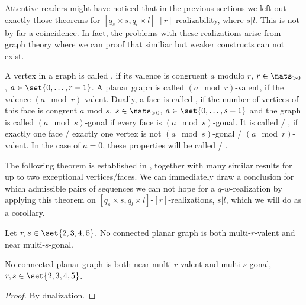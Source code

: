 \label{sec:negative:results}

Attentive readers might have noticed that in the previous sections we left out exactly those theorems for $[q_s \times s, q_l \times l]$-$[r]$-realizability, where $s | l$. This is not by far a coincidence. In fact, the problems with these realizations arise from graph theory where we can proof that similiar but weaker constructs can not exist.
\clearpage
\begin{definition} A vertex in a graph is called , if its valence is congruent $a$ modulo $r$, $r \in \nats_{>0}$, $a \in \set{0, \dots, r - 1}$. A planar graph is called $(a \mod r)$-valent, if the valence $(a \mod r)$-valent. Dually, a face is called , if the number of vertices of this face is congrent $a$ mod $s$, $s \in \nats_{>0}$, $a \in \set{0, \dots, s - 1}$ and the graph is called $(a \mod s)$-gonal if every face is $(a \mod s)$-gonal. It is called  / , if exactly one face / exactly one vertex is not $(a \mod s)$-gonal / $(a \mod r)$-valent. In the case of $a = 0$, these properties will be called  / .
\end{definition}

The following theorem is established in \cite{malkevitch1970properties}, together with many similar results for up to two exceptional vertices/faces. We can immediately draw a conclusion for which admissible pairs of sequences we can not hope for a $q$-$w$-realization by applying this theorem on $[q_s \times s, q_l \times l]$-$[r]$-realizations, $s | l$, which we will do as a corollary.

\begin{theorem}\label{thm:near:regular:nonrealizable} Let $r, s \in \set{2, 3, 4, 5}$. No connected planar graph is both multi-$r$-valent and near multi-$s$-gonal.
\end{theorem}
\begin{corollary} No connected planar graph is both near multi-$r$-valent and multi-$s$-gonal, $r, s \in \set{2, 3, 4, 5}$.
\begin{proof}By dualization.
\end{proof}
\end{corollary}

